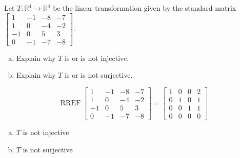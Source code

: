 
\begin{exerciseStatement}
 Let \(T:\mathbb{R}^ 4  \to \mathbb{R}^ 4 \) be the linear transformation given by the standard matrix \( \left[\begin{array}{cccc}
1 & -1 & -8 & -7 \\
1 & 0 & -4 & -2 \\
-1 & 0 & 5 & 3 \\
0 & -1 & -7 & -8
\end{array}\right] .\)
\begin{enumerate}[(a)]
\item Explain why \(T\) is or is not injective.
\item Explain why \(T\) is or is not surjective.
\end{enumerate}
    
\end{exerciseStatement}
    
\begin{exerciseAnswer} 


\[\operatorname{RREF} \left[\begin{array}{cccc}
1 & -1 & -8 & -7 \\
1 & 0 & -4 & -2 \\
-1 & 0 & 5 & 3 \\
0 & -1 & -7 & -8
\end{array}\right] = \left[\begin{array}{cccc}
1 & 0 & 0 & 2 \\
0 & 1 & 0 & 1 \\
0 & 0 & 1 & 1 \\
0 & 0 & 0 & 0
\end{array}\right] \]


\begin{enumerate}[(a)]
\item \(T\) is not injective
\item \(T\) is not surjective
\end{enumerate}
    
\end{exerciseAnswer}
    
